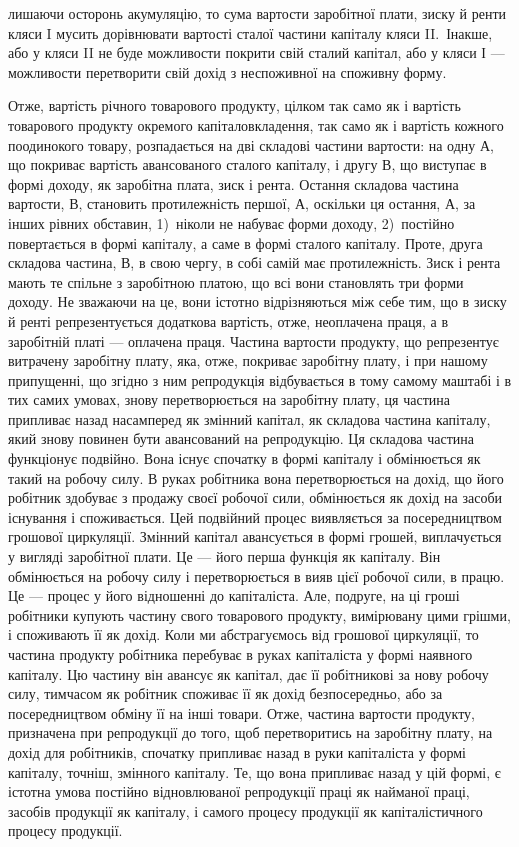 \parcont{}  %
лишаючи осторонь акумуляцію, то сума вартости заробітної плати, зиску й ренти
кляси I мусить дорівнювати вартості сталої частини капіталу кляси II.~Інакше,
або у кляси II не буде можливости покрити свій сталий капітал, або у кляси І —
можливости перетворити свій дохід з неспоживної на споживну форму.

Отже, вартість річного товарового продукту, цілком так само як і вартість
товарового продукту окремого капіталовкладення, так само як і вартість кожного
поодинокого товару, розпадається на дві складові частини вартости: на одну $А$, що
покриває вартість авансованого сталого капіталу, і другу $В$, що виступає в формі
доходу, як заробітна плата, зиск і рента. Остання складова частина вартости, $В$,
становить протилежність першої, $А$, оскільки ця остання, $А$, за інших рівних
обставин, 1)~ніколи не набуває форми доходу, 2)~постійно повертається в формі
капіталу, а саме в формі сталого капіталу. Проте, друга складова частина, $В$,
в свою чергу, в собі самій має протилежність. Зиск і рента мають те спільне з заробітною
платою, що всі вони становлять три форми доходу. Не зважаючи на це,
вони істотно відрізняються між себе тим, що в зиску й ренті репрезентується
додаткова вартість, отже, неоплачена праця, а в заробітній платі — оплачена
праця. Частина вартости продукту, що репрезентує витрачену заробітну плату,
яка, отже, покриває заробітну плату, і при нашому припущенні, що згідно з ним
репродукція відбувається в тому самому маштабі і в тих самих умовах, знову
перетворюється на заробітну плату, ця частина припливає назад насамперед
як змінний капітал, як складова частина капіталу, який знову повинен бути
авансований на репродукцію. Ця складова частина функціонує подвійно. Вона
існує спочатку в формі капіталу і обмінюється як такий на робочу силу. В руках
робітника вона перетворюється на дохід, що його робітник здобуває з продажу
своєї робочої сили, обмінюється як дохід на засоби існування і споживається.
Цей подвійний процес виявляється за посередництвом грошової циркуляції. Змінний
капітал авансується в формі грошей, виплачується у вигляді заробітної плати.
Це — його перша функція як капіталу. Він обмінюється на робочу силу і перетворюється
в вияв цієї робочої сили, в працю. Це — процес у його відношенні до
капіталіста. Але, подруге, на ці гроші робітники купують частину свого товарового
продукту, вимірювану цими грішми, і споживають її як дохід. Коли ми
абстрагуємось від грошової циркуляції, то частина продукту робітника перебуває
в руках капіталіста у формі наявного капіталу. Цю частину він авансує як
капітал, дає її робітникові за нову робочу силу, тимчасом як робітник споживає
її як дохід безпосередньо, або за посередництвом обміну її на інші товари.
Отже, частина вартости продукту, призначена при репродукції до того, щоб перетворитись
на заробітну плату, на дохід для робітників, спочатку припливає
назад в руки капіталіста у формі капіталу, точніш, змінного капіталу. Те, що
вона припливає назад у цій формі, є істотна умова постійно відновлюваної
репродукції праці як найманої праці, засобів продукції як капіталу, і самого
процесу продукції як капіталістичного процесу продукції.

